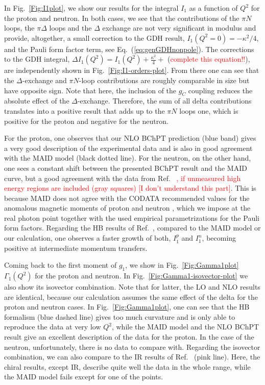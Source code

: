 \documentclass[twocolumn,prc,showpacs,nofootinbib,preprintnumbers,amsmath,amssymb,superscriptaddress]{revtex4-1}
\def\Eqref#1{Eq.~(\ref{eq:#1})}
\begin{document}
In Fig.~\ref{Fig:I1plot}, we show our results for the integral $I_1$ as a function of $Q^2$ for the proton and neutron.
In both cases, we see that the contributions of the $\pi N$ loops, the $\pi \Delta$ loops and the $\Delta$ exchange are not very significant in modulus and provide, altogether, a small correction to the GDH result, $I_1(Q^2=0)=-\kappa^2/4$, and the Pauli form factor term, see \Eqref{genGDHnonpole}.
The corrections to the GDH integral, $\Delta I_1(Q^2)=I_1(Q^2)+\frac{\kappa^2}{4} + $ (\textcolor{red}{complete this equation!!}), are independently shown in Fig.~\ref{Fig:I1-orders-plot}.
From there one can see that the $\Delta$-exchange and $\pi N$-loop contributions are roughly comparable in size but have opposite sign. Note that here, the inclusion of the $g_C$ coupling reduces the absolute effect of the $\Delta$-exchange. Therefore,
the sum of all delta contributions translates into a positive result that adds up to the $\pi N$ loops one, which is positive for the proton and negative for the neutron. 

For the proton, one observes that our NLO BChPT prediction (blue band) gives a very good description of the experimental data \cite{Prok:2008ev,Zielinski:2017gwp} and is also in good agreement with the MAID model \cite{MAID} (black dotted line). For the neutron, on the other hand, one sees a constant shift between the presented BChPT result and the MAID curve, but a good agreement with the data from Ref.~\cite{Guler:2015} \textcolor{red}{, if unmeasured high energy regions are included (gray squares) [I don't understand this part]}. This is because MAID does not agree with the CODATA recommended values for the anomalous magnetic moments of proton and neutron \cite{Mohr:2012tt}, which we impose at the real photon point together with the used empirical parametrizations for the Pauli form factors. 
Regarding the HB results of Ref.~\cite{Kao:2003jd}, compared to the MAID model or our calculation, one observes a faster growth of both, $I_1^p$ and $I_1^n$, becoming positive at intermediate momentum transfers.


Coming back to the first moment of $g_1$, we show in Fig.~\ref{Fig:Gamma1plot} $\Gamma_1(Q^2)$ for the proton and neutron.
In Fig.~\ref{Fig:Gamma1-isovector-plot} we also show its isovector combination. 
Note that for latter, the LO and NLO results are identical, because our calculation assumes the same effect of the delta for the proton and neutron cases.
In Fig.~\ref{Fig:Gamma1plot}, one can see that the HB formalism (blue dashed line) gives too much curvature and is only able to reproduce the data at very low $Q^2$, while the MAID model and the NLO BChPT result give an excellent description of the data for the proton.
In the case of the neutron, unfortunately, there is no data to compare with. 
Regarding the isovector combination, we can also compare to the IR results of Ref.~\cite{Bernard:2002pw} (pink line). 
Here, the chiral results, except IR, describe quite well the data in the whole range, while the MAID model fails except for one of the points.
\end{document}
